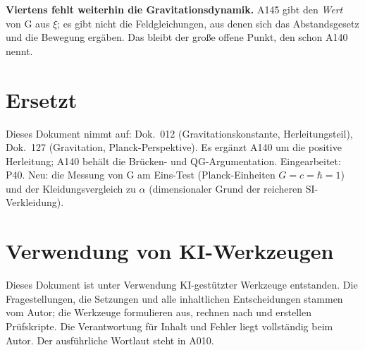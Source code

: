 \textbf{Viertens fehlt weiterhin die Gravitationsdynamik.} A145 gibt den
\emph{Wert} von G aus $\xi$; es gibt nicht die Feldgleichungen, aus denen sich
das Abstandsgesetz und die Bewegung ergäben. Das bleibt der große offene Punkt,
den schon A140 nennt.

\section{Ersetzt}

Dieses Dokument nimmt auf: Dok.~012 (Gravitationskonstante, Herleitungsteil),
Dok.~127 (Gravitation, Planck-Perspektive). Es ergänzt A140 um die positive
Herleitung; A140 behält die Brücken- und QG-Argumentation.
Eingearbeitet: P40. Neu: die Messung von G am Eins-Test (Planck-Einheiten $G=c=\hbar=1$) und der Kleidungsvergleich zu $\alpha$ (dimensionaler Grund der reicheren SI-Verkleidung).

\section{Verwendung von KI-Werkzeugen}

Dieses Dokument ist unter Verwendung KI-gestützter Werkzeuge entstanden. Die
Fragestellungen, die Setzungen und alle inhaltlichen Entscheidungen stammen vom
Autor; die Werkzeuge formulieren aus, rechnen nach und erstellen Prüfskripte.
Die Verantwortung für Inhalt und Fehler liegt vollständig beim Autor. Der
ausführliche Wortlaut steht in A010.
